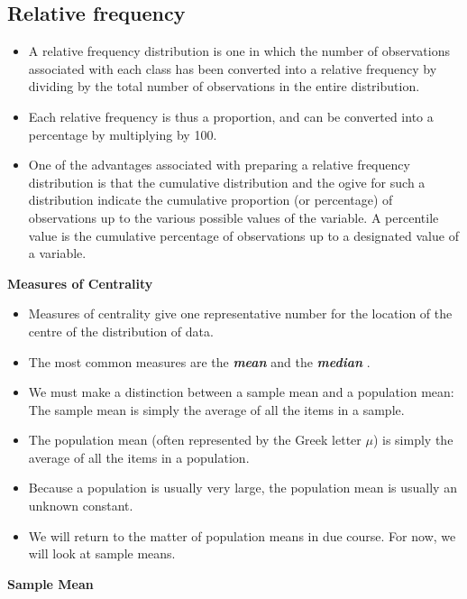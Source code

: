 \documentclass[]{report}
\begin{document}
\subsection{Relative frequency}
\begin{itemize}
	\item A relative frequency distribution is one in which the number of observations associated with each class has
	been converted into a relative frequency by dividing by the total number of observations in the entire
	distribution. 
	\item Each relative frequency is thus a proportion, and can be converted into a percentage by multiplying
	by 100.\item One of the advantages associated with preparing a relative frequency distribution is that the cumulative
	distribution and the ogive for such a distribution indicate the cumulative proportion (or percentage) of
	observations up to the various possible values of the variable. A percentile value is the cumulative percentage of
	observations up to a designated value of a variable.
\end{itemize}





\noindent \textbf{Measures of Centrality}

\begin{itemize}
	\item Measures of centrality give one representative number for the location of the centre of the distribution of data.
	\item
	The most common measures are the \textbf{\emph{mean}} and the \textbf{\emph{ median }}.
	\item We must make a distinction between a sample mean and a population mean: The sample mean is simply the average of all the items in a sample.  \item The population mean (often represented by the Greek letter $\mu$) is simply the average of all the items in a population. \item Because a population is usually very large, the population mean is usually an unknown constant.
	\item We will return to the matter of population means in due course. For now, we will look at sample means.
\end{itemize}


\noindent \textbf{Sample Mean}
\end{document}
